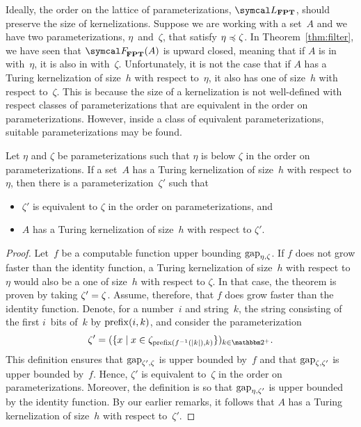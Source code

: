 Ideally, the order on the lattice of parameterizations, $\calL_\cl{FPT}$, should preserve the size of kernelizations.
Suppose we are working with a set~$A$ and we have two parameterizations, $\eta$~and~$\zeta$, that satisfy $\eta \preccurlyeq \zeta$.
In Theorem~\ref{thm:filter}, we have seen that $\calF_\cl{FPT}(A)$ is upward closed, meaning that if $A$ is in  with~$\eta$, it is also in  with~$\zeta$.
Unfortunately, it is not the case that if $A$ has a Turing kernelization of size~$h$ with respect to~$\eta$, it also has one of size~$h$ with respect to~$\zeta$.
This is because the size of a kernelization is not well-defined with respect classes of parameterizations that are equivalent in the order on parameterizations.
However, inside a class of equivalent parameterizations, suitable parameterizations may be found.
\begin{theorem}
  Let $\eta$ and $\zeta$ be parameterizations such that $\eta$ is below $\zeta$ in the order on parameterizations.
  If a set~$A$ has a Turing kernelization of size~$h$ with respect to $\eta$, then there is a parameterization~$\zeta'$ such that
  \begin{itemize}
  \item $\zeta'$ is equivalent to $\zeta$ in the order on parameterizations, and
  \item $A$ has a Turing kernelization of size~$h$ with respect to $\zeta'$.
  \end{itemize}
\end{theorem}
\begin{proof}
  Let~$f$ be a computable function upper bounding $\operatorname{gap}_{\eta, \zeta}$.
  If $f$ does not grow faster than the identity function, a Turing kernelization of size~$h$ with respect to $\eta$ would also be a one of size~$h$ with respect to $\zeta$.
  In that case, the theorem is proven by taking $\zeta' = \zeta$.
  Assume, therefore, that $f$ does grow faster than the identity function.
  Denote, for a number~$i$ and string~$k$, the string consisting of the first $i$~bits of~$k$ by $\operatorname{prefix}(i, k)$, and consider the parameterization
  \begin{equation*}
    \zeta' \deq (\{x \st x \in \zeta_{\prefix(f^{-1}(\length{k}), k)}\})_{k \in \binary^+}.
  \end{equation*}
  This definition ensures that $\operatorname{gap}_{\zeta', \zeta}$ is upper bounded by~$f$ and that $\operatorname{gap}_{\zeta, \zeta'}$ is upper bounded by~$f$.
  Hence, $\zeta'$ is equivalent to~$\zeta$ in the order on parameterizations.
  Moreover, the definition is so that $\operatorname{gap}_{\eta, \zeta'}$ is upper bounded by the identity function.
  By our earlier remarks, it follows that $A$ has a Turing kernelization of size~$h$ with respect to~$\zeta'$.
\end{proof}

